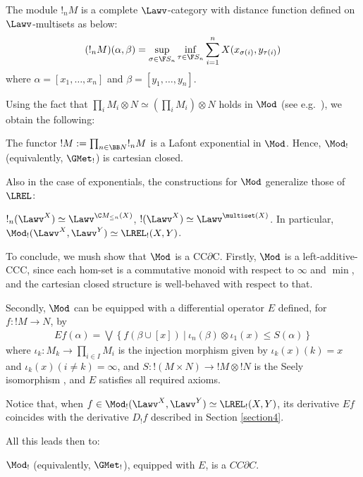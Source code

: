 The module $!_{n}M$ is a complete $\Lawv$-category with distance function defined on $\Lawv$-multisets as below:
\begin{align}
(!_{n}M)(\alpha,\beta)=
\sup_{\sigma\in \F S_{n}}\inf_{\tau\in \F S_{n}}\sum_{i=1}^{n}
X(x_{\sigma(i)},y_{\tau(i)})
\end{align}
where $\alpha=[x_{1},\dots, x_{n}]$ and $\beta= [y_{1},\dots, y_{n}]$.




Using the fact that $\prod_{i}M_{i}\otimes  N\simeq (\prod_{i}M_{i})\otimes N$ holds in $\Mod$ (see e.g.~\cite{Russo2007}), we obtain the following:
\begin{theorem}
The functor $!M:= \prod_{n\in \BB N}!_{n}M$ is a Lafont exponential in $\Mod$.
Hence, $\Mod_{!}$ (equivalently, $\GMet_{!}$) is cartesian closed. 
\end{theorem}

Also in the case of exponentials, the constructions for $\Mod$ generalize those of $\LREL$:
\begin{proposition}
$!_{n}(\Lawv^{X})\simeq \Lawv^{\C M_{\leq n}(X)}$, $!(\Lawv^{X})\simeq \Lawv^{\multiset(X)}$. In particular, $\Mod_{!}(\Lawv^{X},\Lawv^{Y})\simeq \LREL_{!}(X,Y)$.
\end{proposition}

To conclude, we mush show that $\Mod$ is a CC$\partial$C.
Firstly, $\Mod$ is a left-additive-CCC, since each hom-set is a commutative monoid with respect to $\infty$ and $\min$, and the cartesian closed structure is well-behaved with respect to that.

Secondly, $\Mod$ can be equipped with a differential operator $E$ defined, for $f:!M\to N$, by 
\begin{align}\label{eq:dermod}
Ef(\alpha)=
\bigvee\left\{
f(\beta\cup [x]) \ \Big \vert  \ 
\iota_{n}(\beta)\otimes \iota_{1}(x) \leq S(\alpha)
\right\}
\end{align}
where $\iota_{k}: M_{k}\to \prod_{i\in I}M_{i}$ is the injection morphism given by $\iota_{k}(x)( k)=x$ and $\iota_{k}(x)(i\neq k)=\infty$,
and $S: !(M\times N)\to !M\otimes !N$ is the Seely isomorphism \cite{Mellies2018}, and $E$ satisfies all required axioms.

Notice that, when $f\in \Mod_{!}(\Lawv^{X},\Lawv^{Y})\simeq \LREL_{!}(X,Y)$, its derivative $E f$ coincides with the derivative $D_{!}f$ described in Section \ref{section4}. 

All this leads then to:
\begin{theorem}
$\Mod_{!}$ (equivalently, $\GMet_{!}$), equipped with $E$, is a $CC\partial C$.
\end{theorem}




